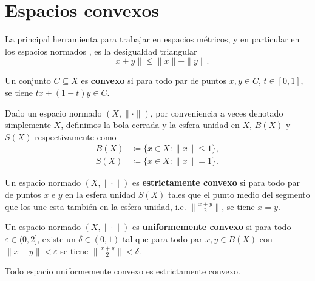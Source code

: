 \section{Espacios convexos}

La principal herramienta para trabajar en espacios métricos, y en particular en los espacios normados \cite{babb}, es la desigualdad triangular 
\begin{equation}
    \| x + y \| \leq \| x \| + \| y \|.
\end{equation}

\begin{definition}
    Un conjunto $ C \subseteq X $ es {\bf convexo} si para todo par de puntos $ x, y \in C $, $ t \in [0, 1] $, se tiene $ tx + (1-t)y \in C $.
\end{definition}

Dado un espacio normado $ (X, \| \cdot \|) $, por conveniencia a veces denotado simplemente $ X $, definimos la bola cerrada y la esfera unidad en $ X $, $ B(X) $ y $ S(X) $ respectivamente como
\begin{equation}
\begin{split}
    B(X) &\coloneq \{x \in X \colon \| x \| \leq 1 \}, \\
    S(X) &\coloneq \{x \in X \colon \| x \| = 1 \}.
\end{split}
\end{equation}

\begin{definition}
    Un espacio normado $ (X, \| \cdot \|) $ es {\bf estrictamente convexo} si para todo par de puntos $ x $ e $ y $ en la esfera unidad $ S(X) $ tales que el punto medio del segmento que los une esta también en la esfera unidad, i.e. $\| \frac{x+y}{2}\| $, se tiene $ x = y $.
\end{definition}

\begin{definition}
    Un espacio normado $ (X, \| \cdot \|) $ es {\bf uniformemente convexo} si para todo $ \varepsilon \in (0, 2] $, existe un $ \delta \in (0, 1) $ tal que para todo par $ x, y \in B(X) $ con $ \| x - y \| < \varepsilon $ se tiene $ \| \frac{x+y}{2} \| < \delta $.
\end{definition}

\begin{corollary} \label{coro:1}
    Todo espacio uniformemente convexo es estrictamente convexo.
\end{corollary}

